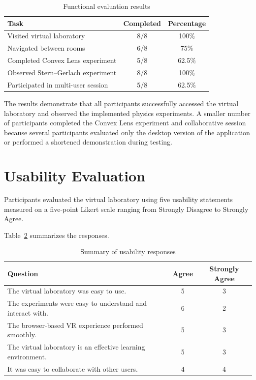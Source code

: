 \begin{table}[H]
\centering
\caption{Functional evaluation results}
\label{tab:functional}
\renewcommand{\arraystretch}{1.3}
\begin{tabular}{lcc}
\hline
\textbf{Task} & \textbf{Completed} & \textbf{Percentage} \\
\hline
Visited virtual laboratory & 8/8 & 100\% \\
Navigated between rooms & 6/8 & 75\% \\
Completed Convex Lens experiment & 5/8 & 62.5\% \\
Observed Stern--Gerlach experiment & 8/8 & 100\% \\
Participated in multi-user session & 5/8 & 62.5\% \\
\hline
\end{tabular}
\end{table}

The results demonstrate that all participants successfully accessed the virtual laboratory and observed the implemented physics experiments. A smaller number of participants completed the Convex Lens experiment and collaborative session because several participants evaluated only the desktop version of the application or performed a shortened demonstration during testing.

\section{Usability Evaluation}

Participants evaluated the virtual laboratory using five usability statements measured on a five-point Likert scale ranging from Strongly Disagree to Strongly Agree.

Table~\ref{tab:usability} summarizes the responses.

\begin{table}[H]
\centering
\caption{Summary of usability responses}
\label{tab:usability}
\renewcommand{\arraystretch}{1.3}
\begin{tabular}{p{9cm}cc}
\hline
\textbf{Question} & \textbf{Agree} & \textbf{Strongly Agree} \\
\hline
The virtual laboratory was easy to use. & 5 & 3 \\
The experiments were easy to understand and interact with. & 6 & 2 \\
The browser-based VR experience performed smoothly. & 5 & 3 \\
The virtual laboratory is an effective learning environment. & 5 & 3 \\
It was easy to collaborate with other users. & 4 & 4 \\
\hline
\end{tabular}
\end{table}

